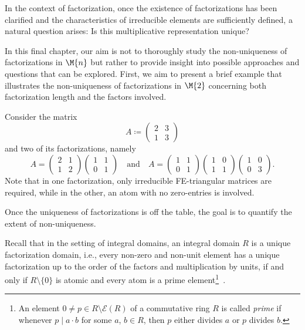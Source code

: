 In the context of factorization, once the existence of factorizations has been clarified and the characteristics of irreducible elements are sufficiently defined, a natural question arises: Is this multiplicative representation unique? 

In this final chapter, our aim is not to thoroughly study the non-uniqueness of factorizations in $\M{n}$ but rather to provide insight into possible approaches and questions that can be explored. First, we aim to present a brief example that illustrates the non-uniqueness of factorizations in $\M{2}$ concerning both factorization length and the factors involved.

\begin{example}
Consider the matrix
\[ A \coloneqq \begin{pmatrix} 2 & 3 \\ 1 & 3 \end{pmatrix} \]
and two of its factorizations, namely
\[ A = \begin{pmatrix} 2 & 1 \\ 1 & 2 \end{pmatrix} \begin{pmatrix} 1 & 1 \\ 0 & 1 \end{pmatrix} \quad \text{and} \quad A = \begin{pmatrix} 1 & 1 \\ 0 & 1 \end{pmatrix} \begin{pmatrix} 1 & 0 \\ 1 & 1 \end{pmatrix} \begin{pmatrix} 1 & 0 \\ 0 & 3 \end{pmatrix}. \]
Note that in one factorization, only irreducible FE-triangular matrices are required, while in the other, an atom with no zero-entries is involved.
\end{example}

Once the uniqueness of factorizations is off the table, the goal is to quantify the extent of non-uniqueness. 

\begin{remark*}
Recall that in the setting of integral domains, an integral domain $R$ is a unique factorization domain, i.e., every non-zero and non-unit element has a unique factorization up to the order of the factors and multiplication by units, if and only if $R\setminus\{ 0 \}$ is atomic and every atom is a prime element\footnote{An element $0 \neq p \in R\setminus \mathcal{E}(R)$ of a commutative ring $R$ is called \emph{prime} if whenever $p \mid  a\cdot b$ for some $a$, $b \in R$, then $p$ either divides $a$ or $p$ divides $b$.}~\cite[Chapter III, § 5, Theorem 5.6]{Jantzen2013}.
\end{remark*}

